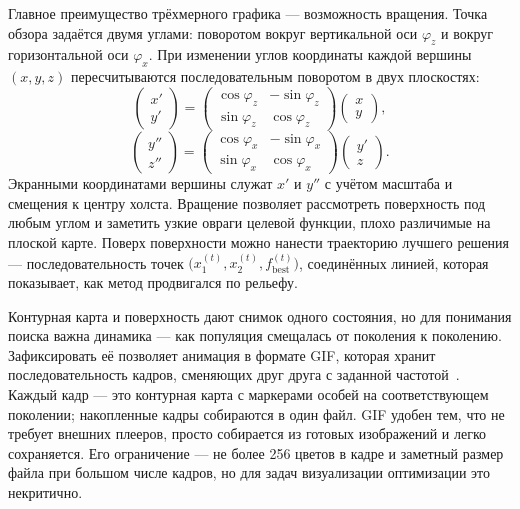 \documentclass[14pt, a4paper]{extarticle}
\begin{document}
Главное преимущество трёхмерного графика --- возможность вращения. Точка обзора
задаётся двумя углами: поворотом вокруг вертикальной оси $\varphi_z$ и вокруг
горизонтальной оси $\varphi_x$. При изменении углов координаты каждой вершины
$(x, y, z)$ пересчитываются последовательным поворотом в двух плоскостях:
\begin{equation}\label{eq:rot-z}
  \begin{pmatrix} x' \\ y' \end{pmatrix} =
  \begin{pmatrix}
    \cos\varphi_z & -\sin\varphi_z \\
    \sin\varphi_z & \cos\varphi_z
  \end{pmatrix}
  \begin{pmatrix} x \\ y \end{pmatrix},
\end{equation}
\begin{equation}\label{eq:rot-x}
  \begin{pmatrix} y'' \\ z'' \end{pmatrix} =
  \begin{pmatrix}
    \cos\varphi_x & -\sin\varphi_x \\
    \sin\varphi_x & \cos\varphi_x
  \end{pmatrix}
  \begin{pmatrix} y' \\ z \end{pmatrix}.
\end{equation}
Экранными координатами вершины служат $x'$ и $y''$ с учётом масштаба и смещения к
центру холста. Вращение позволяет рассмотреть поверхность под любым углом и
заметить узкие овраги целевой функции, плохо различимые на плоской карте. Поверх
поверхности можно нанести траекторию лучшего решения --- последовательность точек
$\bigl(x_1^{(t)}, x_2^{(t)}, f_{\text{best}}^{(t)}\bigr)$, соединённых линией,
которая показывает, как метод продвигался по рельефу.

Контурная карта и поверхность дают снимок одного состояния, но для понимания
поиска важна динамика --- как популяция смещалась от поколения к поколению.
Зафиксировать её позволяет анимация в формате GIF, которая хранит последовательность
кадров, сменяющих друг друга с заданной частотой~\cite{gif89a}. Каждый кадр ---
это контурная карта с маркерами особей на соответствующем поколении; накопленные
кадры собираются в один файл. GIF удобен тем, что не требует внешних плееров,
просто собирается из готовых изображений и легко сохраняется. Его ограничение ---
не более 256 цветов в кадре и заметный размер файла при большом числе кадров, но
для задач визуализации оптимизации это некритично.
\end{document}

